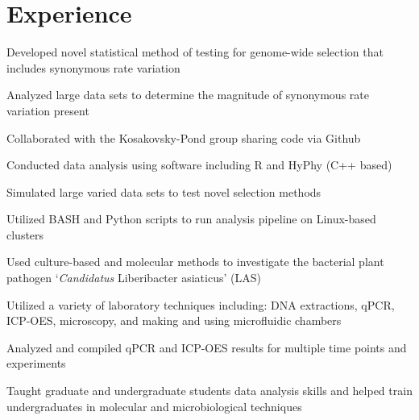 \documentclass[]{deedy-resume-openfont}
\begin{document}
\begin{minipage}[t]{0.65\textwidth} 


\section{Experience}

\vspace{\topsep} %
\begin{tightemize}
\item {Developed novel statistical method of testing for genome-wide selection that includes synonymous rate variation}
\item {Analyzed large data sets to determine the magnitude of synonymous rate variation present}
\item Collaborated with the Kosakovsky-Pond group sharing code via Github 
\item {Conducted data analysis using software including R and HyPhy (C++ based)}
\item {Simulated large varied data sets to test novel selection methods}
\item {Utilized BASH and Python scripts to run analysis pipeline on Linux-based clusters}
\end{tightemize}
\sectionsep

\begin{tightemize}
\item {Used culture-based and molecular methods to investigate the bacterial plant pathogen  ‘\textit{Candidatus} Liberibacter asiaticus’ (LAS)}
\item {Utilized a variety of laboratory techniques including: DNA extractions, qPCR, ICP-OES, microscopy, and making and using microfluidic chambers}
\item Analyzed and compiled qPCR and ICP-OES results for multiple time points and experiments
\item {Taught graduate and undergraduate students data analysis skills and helped train undergraduates in molecular and microbiological techniques }
\end{tightemize}
\sectionsep


\end{minipage}
\end{document}
